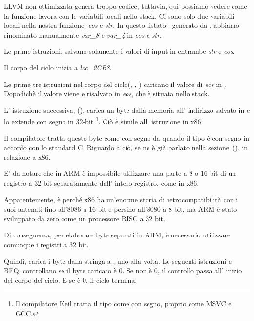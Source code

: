 ﻿

\mysubparagraph{\NonOptimizingXcodeIV (\ARMMode)}



LLVM non ottimizzata genera troppo codice, tuttavia, qui possiamo vedere come la funzione lavora con 
le variabili locali nello stack.
Ci sono solo due variabili locali nella nostra funzione: \emph{eos} e \emph{str}.
In questo listato , generato da \IDA, abbiamo rinominato manualmente \emph{var\_8} e \emph{var\_4} in \emph{eos} e \emph{str}.

Le prime istruzioni, salvano solamente i valori di input in entrambe \emph{str} e \emph{eos}.

Il corpo del ciclo inizia a \emph{loc\_2CB8}.

Le prime tre istruzioni nel corpo del ciclo(, \ADD, ) caricano il valore di \emph{eos} in . 
Dopodichè il valore viene  e risalvato in \emph{eos}, che è situata nello stack.

L' istruzione successiva,   (), carica un byte dalla memoria all' indirizzo salvato in  e lo extende con segno in 32-bit
\footnote{Il compilatore Keil tratta il tipo \Tchar come con segno, proprio come MSVC e GCC.}.
Ciò è simile all' istruzione \MOVSX in x86.

Il compilatore tratta questo byte come con segno da quando il tipo \Tchar è con segno in accordo con lo standard C.
Riguardo a ciò, se ne è già parlato nella sezione~(), in relazione a x86.


E' da notare che in ARM è impossibile utilizzare una parte a 8 o 16 bit  
di un registro a 32-bit separatamente dall' intero registro,
come in x86.

Apparentemente, è perché x86 ha un'enorme storia di retrocompatibilità con i suoi antenati
 fino all'8086 a 16 bit e persino all'8080 a 8 bit,
 ma ARM è stato sviluppato da zero come un processore RISC a 32 bit.

Di conseguenza, per elaborare byte separati in ARM, è necessario utilizzare comunque i registri a 32 bit.

Quindi,  carica i byte dalla stringa a , uno alla volta.
Le seguenti istruzioni \CMP e \ac{BEQ}, controllano se il byte caricato è 0.
Se non è 0, il controllo passa all' inizio del corpo del ciclo.
E se è 0, il ciclo termina.

